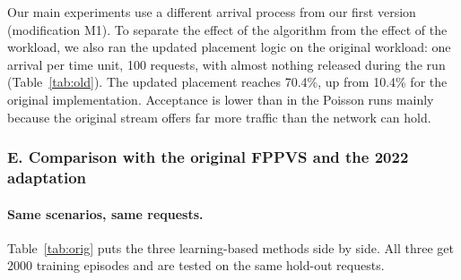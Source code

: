 Our main experiments use a different arrival process from our first version
(modification M1). To separate the effect of the algorithm from the effect of the
workload, we also ran the updated placement logic on the original workload: one
arrival per time unit, 100 requests, with almost nothing released during the run
(Table~\ref{tab:old}). The updated placement reaches 70.4\%, up from 10.4\% for
the original implementation. Acceptance is lower than in the Poisson runs mainly
because the original stream offers far more traffic than the network can hold.

\begin{table}[H]
\centering\small
\caption{Original workload (one arrival per time unit), 5 seeds. The upper
rows are from our first implementation; the lower rows use the updated
environment and placement logic.}
\label{tab:old}

\end{table}

\subsubsection*{E. Comparison with the original FPPVS and the 2022 adaptation}\label{sec:paper}

\paragraph{Same scenarios, same requests.} Table~\ref{tab:orig} puts the three
learning-based methods side by side. All three get 2000 training episodes and
are tested on the same hold-out requests.

\begin{table}[H]
\centering\small
\caption{Original FPPVS, the 2022 adaptation and updated FPPVS on identical
scenarios, mean over \numSeeds{} seeds. $^\ast$Gain = updated FPPVS minus the
better of the other two, in percentage points.}
\label{tab:orig}

\end{table}

